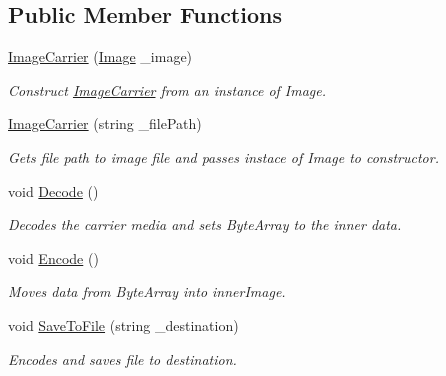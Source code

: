 \subsection*{Public Member Functions}
\begin{DoxyCompactItemize}
\item 
\hyperlink{class_stegosaurus_1_1_carrier_1_1_image_carrier_af33775a68bd7a235779bd102ade02e27}{Image\+Carrier} (\hyperlink{class_stegosaurus_1_1_carrier_1_1_image_carrier_a75c34608afe89054cf1de0729d37f5ac}{Image} \+\_\+image)
\begin{DoxyCompactList}\small\item\em Construct \hyperlink{class_stegosaurus_1_1_carrier_1_1_image_carrier}{Image\+Carrier} from an instance of Image. \end{DoxyCompactList}\item 
\hyperlink{class_stegosaurus_1_1_carrier_1_1_image_carrier_a1729846d0a60c69f86a2c9ef1fe85fbe}{Image\+Carrier} (string \+\_\+file\+Path)
\begin{DoxyCompactList}\small\item\em Gets file path to image file and passes instace of Image to constructor. \end{DoxyCompactList}\item 
void \hyperlink{class_stegosaurus_1_1_carrier_1_1_image_carrier_a1e22e324184654c3a81e0119dff2fd7a}{Decode} ()
\begin{DoxyCompactList}\small\item\em Decodes the carrier media and sets Byte\+Array to the inner data. \end{DoxyCompactList}\item 
void \hyperlink{class_stegosaurus_1_1_carrier_1_1_image_carrier_a0767501e55ca50a07641ca00b010dc7b}{Encode} ()
\begin{DoxyCompactList}\small\item\em Moves data from Byte\+Array into inner\+Image. \end{DoxyCompactList}\item 
void \hyperlink{class_stegosaurus_1_1_carrier_1_1_image_carrier_a6a5a9c575f2ce202512fd99f6cabd0a3}{Save\+To\+File} (string \+\_\+destination)
\begin{DoxyCompactList}\small\item\em Encodes and saves file to destination. \end{DoxyCompactList}\end{DoxyCompactItemize}
